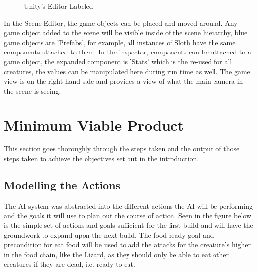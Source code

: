 \documentclass[11pt]{report}
\begin{document}
\begin{figure}[H]
    \centering
    \caption{Unity's Editor Labeled}
\end{figure}

In the Scene Editor, the game objects can be placed and moved around. Any game object added to the scene will be visible inside of the scene hierarchy, blue game objects are 'Prefabs', for example, all instances of Sloth have the same components attached to them. In the inspector, components can be attached to a game object, the expanded component is 'Stats' which is the re-used for all creatures, the values can be manipulated here during run time as well. The game view is on the right hand side and provides a view of what the main camera in the scene is seeing.


\section{Minimum Viable Product}
This section goes thoroughly through the steps taken and the output of those steps taken to achieve the objectives set out in the introduction.
\subsection{Modelling the Actions}
The AI system was abstracted into the different actions the AI will be performing and the goals it will use to plan out the course of action. Seen in the figure below is the simple set of actions and goals sufficient for the first build and will have the groundwork to expand upon the next build. The food ready goal and precondition for eat food will be used to add the attacks for the creature's higher in the food chain, like the Lizard, as they should only be able to eat other creatures if they are dead, i.e. ready to eat.
\end{document}
